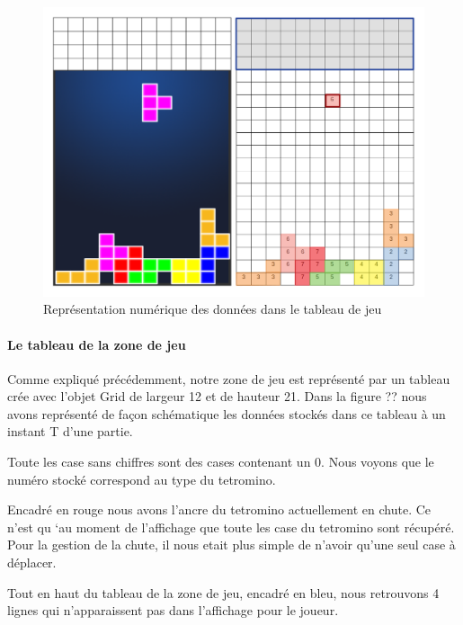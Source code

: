 \documentclass[a4paper, 12pt]{article}
\begin{document}

			\begin{figure}[bt]
				\centering
				\includegraphics[scale=0.35]{img/grid.png}
				\caption{Représentation numérique des données dans le tableau de jeu}
				\label{fig:grid}
			\end{figure}

			\paragraph{Le tableau de la zone de jeu}

			Comme expliqué précédemment, notre zone de jeu est représenté par un tableau crée avec l’objet Grid de largeur 12 et de hauteur 21. Dans la figure ?? nous avons représenté de façon schématique les données stockés dans ce tableau à un instant T d’une partie.

			Toute les case sans chiffres sont des cases contenant un 0. Nous voyons que le numéro stocké correspond au type du tetromino.

			Encadré en rouge nous avons l’ancre du tetromino actuellement en chute. Ce n’est qu ‘au moment de l’affichage que toute les case du tetromino sont récupéré. Pour la gestion de la chute, il nous etait plus simple de n’avoir qu’une seul case à déplacer. 

			Tout en haut du tableau de la zone de jeu, encadré en bleu, nous retrouvons 4 lignes qui n’apparaissent pas dans l’affichage pour le joueur.
\end{document}
